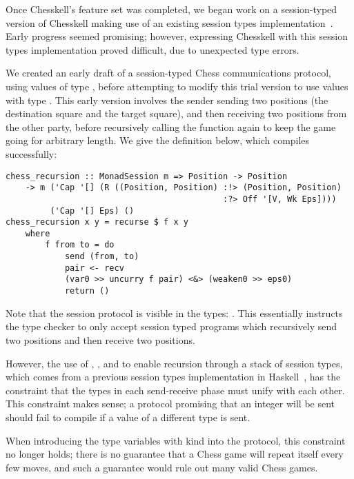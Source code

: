 Once Chesskell's feature set was completed, we began work on a session-typed version of Chesskell making use of an existing session types implementation~\cite{sesstypesincloudhaskell}. Early progress seemed promising; however, expressing Chesskell with this session types implementation proved difficult, due to unexpected type errors.

We created an early draft of a session-typed Chess communications protocol, using values of type , before attempting to modify this trial version to use  values with type . This early version involves the sender sending two positions (the destination square and the target square), and then receiving two positions from the other party, before recursively calling the function again to keep the game going for arbitrary length. We give the definition below, which compiles successfully:

\begin{lstlisting}
chess_recursion :: MonadSession m => Position -> Position
    -> m ('Cap '[] (R ((Position, Position) :!> (Position, Position)
                                            :?> Off '[V, Wk Eps])))
         ('Cap '[] Eps) ()
chess_recursion x y = recurse $ f x y
    where
        f from to = do
            send (from, to)
            pair <- recv
            (var0 >> uncurry f pair) <&> (weaken0 >> eps0)
            return ()
\end{lstlisting}

Note that the session protocol is visible in the types: . This essentially instructs the type checker to only accept session typed programs which recursively send two positions and then receive two positions.

However, the use of , , and  to enable recursion through a stack of session types, which comes from a previous session types implementation in Haskell~\cite{sessalmostnoclass}, has the constraint that the types in each send-receive phase must unify with each other. This constraint makes sense; a protocol promising that an integer will be sent should fail to compile if a value of a different type is sent.

When introducing the type variables with kind  into the protocol, this constraint no longer holds; there is no guarantee that a Chess game will repeat itself every few moves, and such a guarantee would rule out many valid Chess games.

